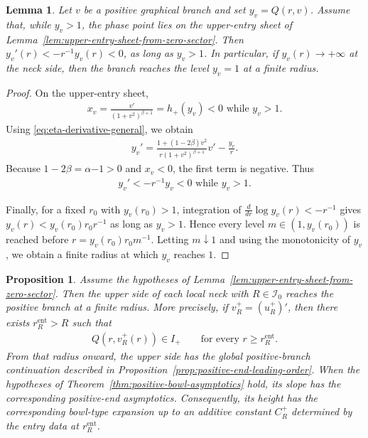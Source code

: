\documentclass{amsart}
\theoremstyle{plain}
\newtheorem{lemma}[theorem]{Lemma}
\newtheorem{proposition}[theorem]{Proposition}
\theoremstyle{mainintrothm}
\theoremstyle{definition}
\begin{document}
\begin{lemma}
	\label{lem:upper-branch-enters-positive-regime}
	Let $v$ be a positive graphical branch and set $y_v=Q(r,v)$.  Assume that,
	while $y_v>1$, the phase point lies on the upper-entry sheet of
	Lemma~\ref{lem:upper-entry-sheet-from-zero-sector}.  Then $y_v'(r)<-r^{-1}y_v(r)<0$, as long as $y_v>1$. In particular, if $y_v(r)\to+\infty$ at the neck side, then the branch
	reaches the level $y_v=1$ at a finite radius.
\end{lemma}

\begin{proof}
	On the upper-entry sheet,
	\begin{align*}
		x_v
		=
		\frac{v'}{(1+v^2)^{\beta+1}}
		=
		h_+(y_v)
		<
		0
		\mbox{ while }y_v>1.
	\end{align*}
	Using \eqref{eq:eta-derivative-general}, we obtain
	\begin{align*}
		y_v'
		=
		\frac{1+(1-2\beta)v^2}
		{r(1+v^2)^{\beta+1}}v'
		-
		\frac{y_v}{r}.
	\end{align*}
	Because $1-2\beta=\alpha{-1}>0$ and $x_v<0$, the first term is
	negative.  Thus
	\begin{align*}
		y_v'<-r^{-1}y_v<0\mbox{ while }y_v>1.
	\end{align*}
	
	Finally, for a fixed $r_0$ with $y_v(r_0)>1$, integration of
	$\frac{d}{dr}\log y_v(r)<-r^{-1}$ gives
	$y_v(r)<y_v(r_0)r_0r^{-1}$ as long as $y_v>1$.  Hence every level
	$m\in(1,y_v(r_0))$ is reached before
	$r=y_v(r_0)r_0m^{-1}$.  Letting $m\downarrow1$ and using the monotonicity
	of $y_v$, we obtain a finite radius at which $y_v$ reaches $1$.
\end{proof}

\begin{proposition}
	\label{prop:upper-side-global-continuation}
	Assume the hypotheses of
	Lemma~\ref{lem:upper-entry-sheet-from-zero-sector}.  Then the upper side of
	each local neck with $R\in\mathcal I_0$ reaches the positive branch at a
	finite radius.  More precisely, if $v_R^+=(u_R^+)'$, then there exists
	$r_R^{\mathrm{ent}}>R$ such that
	\begin{align*}
		Q(r,v_R^+(r))\in I_+
		\qquad
		\text{for every }r\ge r_R^{\mathrm{ent}}.
	\end{align*}
	From that radius onward, the upper side has the global positive-branch
	continuation described in
	Proposition~\ref{prop:positive-end-leading-order}.  When the hypotheses of
	Theorem~\ref{thm:positive-bowl-asymptotics} hold, its slope has the
	corresponding positive-end asymptotics.  Consequently, its height has the
	corresponding bowl-type expansion up to an additive constant
	$C_R^+$ determined by the entry data at $r_R^{\mathrm{ent}}$.
\end{proposition}
\end{document}
